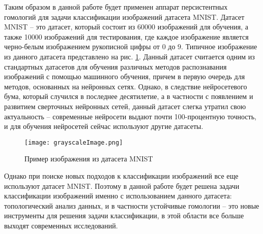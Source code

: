 Таким образом в данной работе будет применен аппарат персистентных гомологий для задачи классификации изображений датасета MNIST. Датасет MNIST -- это датасет, который состоит из 60000 изображений для обучения, а также 10000 изображений для тестирования, где каждое изображение является черно-белым изображением рукописной цифры от $0$ до $9$. Типичное изображение из данного датасета представлено на рис. \ref{mnist-example}. Данный датасет считается одним из стандартных датасетов для обучения различных методов распознавания изображений с помощью машинного обучения, причем в первую очередь для методов, основанных на нейронных сетях. Однако, в следствие нейросетевого бума, который случился в последнее десятилетие, а в частности с появлением и развитием сверточных нейронных сетей, данный датасет слегка утратил свою актуальность -- современные нейросети выдают почти 100-процентную точность, и для обучения нейросетей сейчас используют другие датасеты. 

\begin{figure}[!htbp]
	\begin{center}
		\texttt{[image: grayscaleImage.png]}\\
		\caption{Пример изображения из датасета MNIST}
		\label{mnist-example}
	\end{center}
\end{figure}

Однако при поиске новых подходов к классификации изображений все еще используют датасет MNIST. Поэтому в данной работе будет решена задачи классификации изображений именно с использованием данного датасета: топологический анализ данных, и в частности устойчивые гомологии -- это новые инструменты для решения задачи классификации, в этой области все больше выходят современных исследований.
